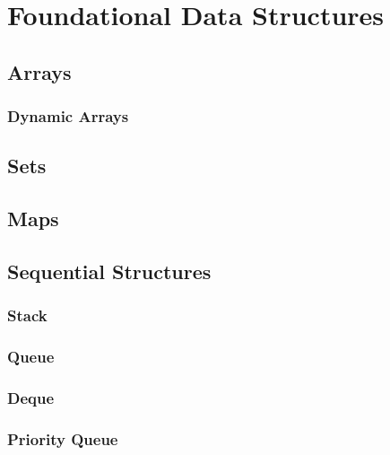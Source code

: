 \section{Foundational Data Structures}
\subsection{Arrays}
\subsubsection{Dynamic Arrays}
\subsection{Sets}
\subsection{Maps}
\subsection{Sequential Structures}
\subsubsection{Stack}
\subsubsection{Queue}
\subsubsection{Deque}
\subsubsection{Priority Queue}